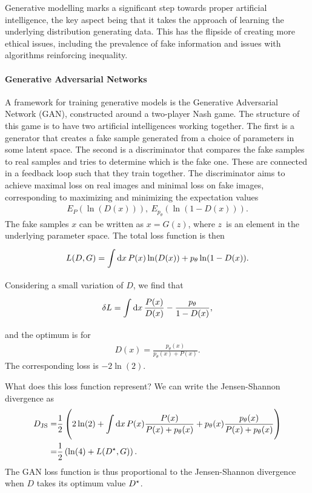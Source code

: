 Generative modelling marks a significant step towards proper artificial intelligence, the key aspect being that it takes the approach of learning the underlying distribution generating data. This has the flipside of creating more ethical issues, including the prevalence of fake information and issues with algorithms reinforcing inequality.

\paragraph{Generative Adversarial Networks}
A framework for training generative models is the Generative Adversarial Network (GAN), constructed around a two-player Nash game. The structure of this game is to have two artificial intelligences working together. The first is a generator that creates a fake sample generated from a choice of parameters in some latent space. The second is a discriminator that compares the fake samples to real samples and tries to determine which is the fake one. These are connected in a feedback loop such that they train together. The discriminator aims to achieve maximal loss on real images and minimal loss on fake images, corresponding to maximizing and minimizing the expectation values
\begin{align*}
	E_{P}(\ln(D(x))),\ E_{p_{\theta}}(\ln(1 - D(x))).
\end{align*}
The fake samples $x$ can be written as $x = G(z)$, where $z$ is an element in the underlying parameter space. The total loss function is then
\begin{align*}
	L(D, G) = \int\limits_{}^{}\dd{x}P(x)\ln(D(x)) + p_{\theta}\ln(1 - D(x)).
\end{align*}
Considering a small variation of $D$, we find that
\begin{align*}
	\var{L} = \int\limits_{}^{}\dd{x}\frac{P(x)}{D(x)} - \frac{p_{\theta}}{1 - D(x)},
\end{align*}
and the optimum is for
\begin{align*}
	D(x) = \frac{p_{\theta}(x)}{p_{\theta}(x) + P(x)}.
\end{align*}
The corresponding loss is $-2\ln(2)$.

What does this loss function represent? We can write the Jensen-Shannon divergence as
\begin{align*}
	D_{\text{JS}} =& \frac{1}{2}\left(2\ln(2) + \int\limits_{}^{}\dd{x}P(x)\frac{P(x)}{P(x) + p_{\theta}(x)} + p_{\theta}(x)\frac{p_{\theta}(x)}{P(x) + p_{\theta}(x)}\right) \\
	              =& \frac{1}{2}\left(\ln(4) + L(D^{\star}, G)\right).
\end{align*}
The GAN loss function is thus proportional to the Jensen-Shannon divergence when $D$ takes its optimum value $D^{\star}$.

